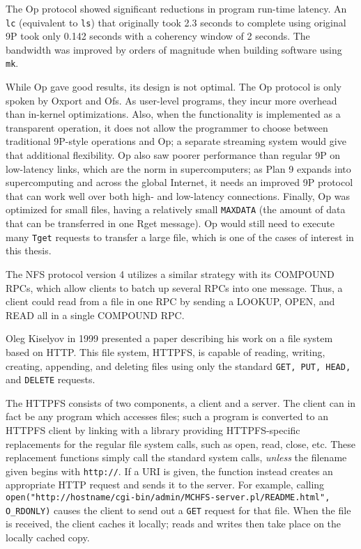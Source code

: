 \documentclass[12pt,american]{report}
\begin{document}
The Op protocol showed significant reductions in program run-time latency. An {\tt lc} (equivalent to {\tt ls}) that originally took 2.3 seconds to complete using original 9P took only 0.142 seconds with a coherency window of 2 seconds. The bandwidth was improved by orders of magnitude when building software using {\tt mk}.

While Op gave good results, its design is not optimal. The Op protocol is only spoken by Oxport and Ofs. As user-level programs, they incur more overhead than in-kernel optimizations. Also, when the functionality is implemented as a transparent operation, it does not allow the programmer to choose between traditional 9P-style operations and Op; a separate streaming system would give that additional flexibility. Op also saw poorer performance than regular 9P on low-latency links, which are the norm in supercomputers; as Plan 9 expands into supercomputing and across the global Internet, it needs an improved 9P protocol that can work well over both high- and low-latency connections. Finally, Op was optimized for small files, having a relatively small {\tt MAXDATA} (the amount of data that can be transferred in one Rget message). Op would still need to execute many {\tt Tget} requests to transfer a large file, which is one of the cases of interest in this thesis.

The NFS protocol version 4 utilizes a similar strategy with its COMPOUND RPCs, which allow clients to batch up several RPCs into one message. Thus, a client could read from a file in one RPC by sending a LOOKUP, OPEN, and READ all in a single COMPOUND RPC.\cite{NFS4}

Oleg Kiselyov in 1999 presented a paper\cite{HTTPFS} describing his work on a file system based on HTTP. This file system, HTTPFS, is capable of reading, writing, creating, appending, and deleting files using only the standard {\tt GET, PUT, HEAD,} and {\tt DELETE} requests.

The HTTPFS consists of two components, a client and a server. The client can in fact be any program which accesses files; such a program is converted to an HTTPFS client by linking with a library providing HTTPFS-specific replacements for the regular file system calls, such as open, read, close, etc. These replacement functions simply call the standard system calls, \emph{unless} the filename given begins with {\tt http://}. If a URI is given, the function instead creates an appropriate HTTP request and sends it to the server. For example, calling {\tt open("http://hostname/cgi-bin/admin/MCHFS-server.pl/README.html", O\_RDONLY)}\cite{HTTPFS} causes the client to send out a {\tt GET} request for that file. When the file is received, the client caches it locally; reads and writes then take place on the locally cached copy.
\end{document}

